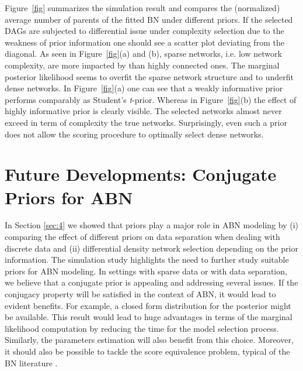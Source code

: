 \documentclass{svproc}
\begin{document}
Figure~\ref{fig} summarizes the simulation result and compares the (normalized) average number of parents of the fitted BN under different priors.
If the selected DAGs are subjected to differential issue under complexity selection due to the weakness of prior information one should see a scatter plot deviating from the diagonal.   As seen in Figure~\ref{fig}(a) and (b), sparse networks, i.e. low network complexity, are more impacted by than highly connected ones. The marginal posterior likelihood seems to overfit the sparse network structure and to underfit dense networks. In Figure~\ref{fig}(a) one can see that a weakly informative prior performs comparably as Student's \emph{t}-prior. Whereas in Figure~\ref{fig}(b) the effect of highly informative prior is clearly visible. The selected networks almost never exceed in term of complexity the true networks. Surprisingly, even such a prior does not allow the scoring procedure to optimally select dense networks.

\section{Future Developments: Conjugate Priors for ABN}
\label{sec:5}

In Section \ref{sec:4} we showed that priors play a major role in ABN modeling by (i) comparing the effect of different priors on data separation when dealing with discrete data and (ii) differential density network selection depending on the prior information. %
The simulation study highlights the need to further study suitable priors for ABN modeling. In settings with sparse data or with data separation, we believe that  a conjugate prior is appealing and addressing several issues. 
If the conjugacy property will be satisfied in the context of ABN, it would lead to evident benefits. For example, a closed form distribution for the posterior might be available.
This result would lead to huge advantages in terms of the marginal likelihood computation by reducing the time for the model selection process. Similarly, the parameters estimation will also benefit from this choice.
Moreover, it should also be possible to tackle the score equivalence problem, typical of the BN literature \cite{Heckerman1995,Pittavino2016}.
\end{document}
